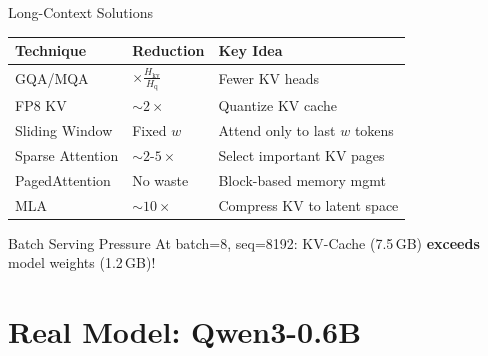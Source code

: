 \documentclass[aspectratio=169, 11pt]{beamer}
\begin{document}
\begin{frame}{Long-Context Solutions}

	\begin{center}
		\small
		\begin{tabular}{@{}llp{3.5cm}@{}}
			\toprule
			\textbf{Technique} & \textbf{Reduction}                          & \textbf{Key Idea}              \\
			\midrule
			GQA/MQA            & $\times \frac{H_{\text{kv}}}{H_{\text{q}}}$ & Fewer KV heads                 \\
			FP8 KV             & $\sim 2\times$                              & Quantize KV cache              \\
			Sliding Window     & Fixed $w$                                   & Attend only to last $w$ tokens \\
			Sparse Attention   & $\sim 2$-$5\times$                          & Select important KV pages      \\
			PagedAttention     & No waste                                    & Block-based memory mgmt        \\
			MLA                & $\sim 10\times$                             & Compress KV to latent space    \\
			\bottomrule
		\end{tabular}
	\end{center}

	\begin{block}{Batch Serving Pressure}
		At batch=8, seq=8192: KV-Cache (7.5\,GB) \textbf{exceeds} model weights (1.2\,GB)!
	\end{block}

\end{frame}

\section{Real Model: Qwen3-0.6B}
\end{document}

